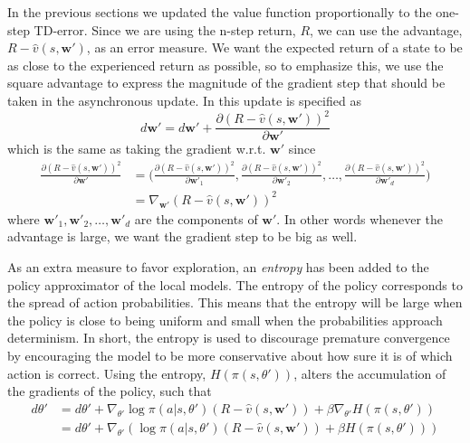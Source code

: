 \documentclass[11pt]{article}
\begin{document}
In the previous sections we updated the value function proportionally to the
one-step TD-error.
Since we are using the n-step return, $R$, we can use the advantage, $R - \hat{v}(s, \mathbf{w'})$,
as an error measure.
We want the expected return of a state to be as close to the experienced return as possible,
so to emphasize this, we use the square advantage to express the magnitude of the
gradient step that should be taken in the asynchronous update.
In \cite{a3c} this update is specified as
\begin{equation}
    d\mathbf{w}' = d\mathbf{w}' + \frac{\partial (R - \hat{v}(s, \mathbf{w'}))^2}{\partial \mathbf{w}'}
\end{equation}
which is the same as taking the gradient w.r.t. $\mathbf{w}'$ since
\begin{equation*}
    \begin{aligned}
        \frac{\partial (R - \hat{v}(s, \mathbf{w}'))^2}{\partial \mathbf{w}'} & = \bigg(
            \frac{\partial (R - \hat{v}(s, \mathbf{w}'))^2}{\partial \mathbf{w}'_1},
            \frac{\partial (R - \hat{v}(s, \mathbf{w}'))^2}{\partial \mathbf{w}'_2}, \dots,
            \frac{\partial (R - \hat{v}(s, \mathbf{w}'))^2}{\partial \mathbf{w}'_d} \bigg) \\
            & = \nabla_{\mathbf{w}'} (R - \hat{v}(s, \mathbf{w}'))^2
    \end{aligned}
\end{equation*}
where $\mathbf{w}'_1, \mathbf{w}'_2, \dots, \mathbf{w}'_d$ are the components of $\mathbf{w}'$.
In other words whenever the advantage is large, we want the gradient step to be big as well.

As an extra measure to favor exploration, an \textit{entropy} has been added
to the policy approximator of the local models.
The entropy of the policy corresponds to the spread of action probabilities.
This means that the entropy will be large when the policy is close to being
uniform and small when the probabilities approach determinism.
In short, the entropy is used to discourage premature convergence
by encouraging the model to be more conservative about how sure it is
of which action is correct.
Using the entropy, $H(\pi(s, \theta'))$, alters the accumulation of the gradients
of the policy, such that
\begin{equation}
    \begin{aligned}
        d\theta' & = d\theta' + \nabla_{\theta'} \log \pi(a|s, \theta')(R - \hat{v}(s, \mathbf{w}')) + \beta \nabla_{\theta'} H(\pi(s, \theta'))\\
                 & = d\theta' + \nabla_{\theta'} (\log \pi(a|s, \theta')(R - \hat{v}(s, \mathbf{w}')) + \beta H(\pi(s, \theta')))
    \end{aligned}
\end{equation}
\end{document}
